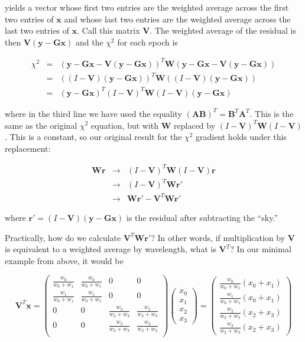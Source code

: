 \documentclass[12pt]{article}
\newcommand{\G}{\mathbf{G}}
\newcommand{\x}{\mathbf{x}}
\newcommand{\y}{\mathbf{y}}
\newcommand{\rvect}{\mathbf{r}}
\newcommand{\W}{\mathbf{W}}
\newcommand{\V}{\mathbf{V}}
\begin{document}
\noindent yields a vector whose first two entries are the weighted
average across the first two entries of $\x$ and whose last two
entries are the weighted average across the last two entries of
$\x$. Call this matrix $\V$. The weighted average of the residual is then
$\V (\y - \G\x)$ and the $\chi^2$ for each epoch is

\begin{eqnarray*}
\chi^2 &=& (\y - \G\x - \V(\y - \G\x))^T \W (\y - \G\x - \V(\y - \G\x)) \\
       &=& ((I - \V)(\y - \G\x))^T \W ((I - \V)(\y - \G\x)) \\
       &=& (\y - \G\x)^T (I - \V)^T \W (I - \V) (\y - \G\x)
\end{eqnarray*}

\noindent where in the third line we have used the equality
$(\mathbf{A}\mathbf{B})^T = \mathbf{B}^T \mathbf{A}^T$. This is the
same as the original $\chi^2$ equation, but with $\W$ replaced by $(I
- \V)^T \W (I - \V)$. This is a constant, so our original result for the
$\chi^2$ gradient holds under this replacement:

\begin{eqnarray*}
\W \rvect &\to& (I - \V)^T \W (I - \V) \rvect \\
          &\to& (I - \V)^T \W \mathbf{r'} \\
          &\to& \W \mathbf{r'} - \V^T \W \mathbf{r'}
\end{eqnarray*}

\noindent where $\mathbf{r'} = (I - \V)(\y - \G\x)$ is the residual after
subtracting the ``sky.''

Practically, how do we calculate $\V^T \W \mathbf{r'}$? In other words, if
multiplication by $\V$ is equivalent to a weighted average by wavelength,
what is $\V^T$? In our minimal example from above, it would be

\begin{equation}
  \V^T \x
  = \left( \begin{array}{cccc}
    \frac{w_0}{w_0 + w_1} & \frac{w_0}{w_0 + w_1} & 0 & 0 \\
    \frac{w_1}{w_0 + w_1} & \frac{w_1}{w_0 + w_1} & 0 & 0 \\
    0   & 0   & \frac{w_2}{w_2 + w_3} & \frac{w_2}{w_2 + w_3} \\
    0   & 0   & \frac{w_3}{w_2 + w_3} & \frac{w_3}{w_2 + w_3} \\
    \end{array} \right)
    \left( \begin{array}{c} x_0 \\ x_1 \\ x_2 \\ x_3 \end{array} \right)
  = \left( \begin{array}{c}
    \frac{w_0}{w_0 + w_1} (x_0 + x_1) \\
    \frac{w_1}{w_0 + w_1} (x_0 + x_1) \\
    \frac{w_2}{w_2 + w_3} (x_2 + x_3) \\
    \frac{w_3}{w_2 + w_3} (x_2 + x_3)
    \end{array} \right)
\end{equation}
\end{document}
